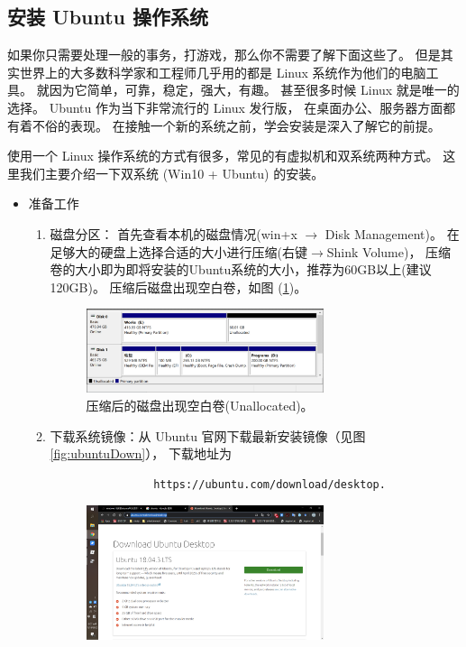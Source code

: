 \subsection{安装 Ubuntu 操作系统}

如果你只需要处理一般的事务，打游戏，那么你不需要了解下面这些了。
但是其实世界上的大多数科学家和工程师几乎用的都是 Linux 系统作为他们的电脑工具。
就因为它简单，可靠，稳定，强大，有趣。
甚至很多时候 Linux 就是唯一的选择。
Ubuntu 作为当下非常流行的 Linux 发行版，
在桌面办公、服务器方面都有着不俗的表现。
在接触一个新的系统之前，学会安装是深入了解它的前提。

使用一个 Linux 操作系统的方式有很多，常见的有虚拟机和双系统两种方式。
这里我们主要介绍一下双系统 (Win10 + Ubuntu) 的安装。

\begin{itemize}
	\item 准备工作
		\begin{enumerate}
			\item 磁盘分区：
			    首先查看本机的磁盘情况(win+x $\to$ Disk Management)。
				在足够大的硬盘上选择合适的大小进行压缩(右键$\to$Shink Volume)，
				压缩卷的大小即为即将安装的Ubuntu系统的大小，推荐为60GB以上(建议120GB)。
				压缩后磁盘出现空白卷，如图 (\ref{fig:shrinkVol})。
				\begin{figure}[htbp]
					\centering
					\includegraphics[width=0.7\textwidth]{png/shrinkVol}
					\caption{压缩后的磁盘出现空白卷(Unallocated)。}
					\label{fig:shrinkVol}
				\end{figure}
			\item 下载系统镜像：从 Ubuntu 官网下载最新安装镜像（见图\ref{fig:ubuntuDown}），
				下载地址为
				\begin{verbatim}
				https://ubuntu.com/download/desktop.
				\end{verbatim}
				\begin{figure}[htbp]
					\centering
					\includegraphics[width=0.7\textwidth]{png/ubuntuDown}

\end{figure}
\end{enumerate}
\end{itemize}
